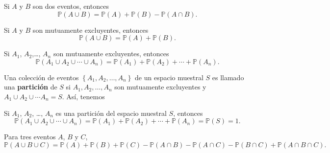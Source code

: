 \begin{theorem}[]
Si $A$ y $B$ son dos eventos, entonces
\begin{equation*}
\mathds{P}\left(A\cup B\right)=\mathds{P}\left(A\right)+\mathds{P}\left(B\right)-\mathds{P}\left(A\cap B\right).
\end{equation*}
\end{theorem}

\begin{corollary}[]
Si $A$ y $B$ son mutuamente excluyentes, entonces
\begin{equation*}
\mathds{P}\left(A\cup B\right)=\mathds{P}\left(A\right)+\mathds{P}\left(B\right).
\end{equation*}
\end{corollary}

\begin{corollary}[]
Si $A_1$, $A_2$,\ldots, $A_n$ son mutuamente excluyentes, entonces
\begin{equation*}
\mathds{P}\left(A_{1}\cup A_{2}\cup\cdots\cup A_{n}\right)=\mathds{P}\left(A_{1}\right)+\mathds{P}\left(A_{2}\right)+\cdots+\mathds{P}\left(A_{n}\right).
\end{equation*}
\end{corollary}
Una colección de eventos $\left\{A_{1},A_{2},\ldots,A_{n}\right\}$ de un espacio muestral $S$ es llamado una \textbf{partición} de $S$ si $A_{1}, A_{2},\ldots, A_{n}$ son mutuamente excluyentes y $A_{1}\cup A_{2}\cup \cdots A_{n}=S$. Así, tenemos
\begin{corollary}[]
Si $A_{1}$, $A_{2}$, \ldots, $A_{n}$ es una partición del espacio muestral $S$, entonces
\begin{equation*}
\mathds{P}\left(A_{1}\cup A_{2}\cup\cdots\cup A_{n}\right)=\mathds{P}\left(A_{1}\right)+\mathds{P}\left(A_{2}\right)+\cdots+\mathds{P}\left(A_{n}\right)=\mathds{P}\left(S\right)=1.
\end{equation*}
\end{corollary}

\begin{theorem}[]
Para tres eventos $A$, $B$ y $C$,
\begin{equation*}
\mathds{P}\left(A\cup B\cup C\right)=\mathds{P}\left(A\right)+\mathds{P}\left(B\right)+\mathds{P}\left(C\right)-\mathds{P}\left(A\cap B\right)-\mathds{P}\left(A\cap C\right)-\mathds{P}\left(B\cap C\right)+\mathds{P}\left(A\cap B\cap C\right).
\end{equation*}
\end{theorem}

